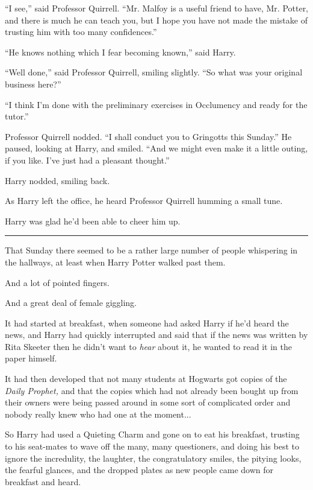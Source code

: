 ``I see,'' said Professor Quirrell. ``Mr. Malfoy is a useful friend to
have, Mr. Potter, and there is much he can teach you, but I hope you
have not made the mistake of trusting him with too many confidences.''

``He knows nothing which I fear becoming known,'' said Harry.

``Well done,'' said Professor Quirrell, smiling slightly. ``So what was
your original business here?''

``I think I'm done with the preliminary exercises in Occlumency and
ready for the tutor.''

Professor Quirrell nodded. ``I shall conduct you to Gringotts this
Sunday.'' He paused, looking at Harry, and smiled. ``And we might even
make it a little outing, if you like. I've just had a pleasant
thought.''

Harry nodded, smiling back.

As Harry left the office, he heard Professor Quirrell humming a small
tune.

Harry was glad he'd been able to cheer him up.

\begin{center}\rule{3in}{0.4pt}\end{center}

That Sunday there seemed to be a rather large number of people
whispering in the hallways, at least when Harry Potter walked past them.

And a lot of pointed fingers.

And a great deal of female giggling.

It had started at breakfast, when someone had asked Harry if he'd heard
the news, and Harry had quickly interrupted and said that if the news
was written by Rita Skeeter then he didn't want to \emph{hear} about it,
he wanted to read it in the paper himself.

It had then developed that not many students at Hogwarts got copies of
the \emph{Daily Prophet,} and that the copies which had not already been
bought up from their owners were being passed around in some sort of
complicated order and nobody really knew who had one at the
moment...

So Harry had used a Quieting Charm and gone on to eat his breakfast,
trusting to his seat-mates to wave off the many, many questioners, and
doing his best to ignore the incredulity, the laughter, the
congratulatory smiles, the pitying looks, the fearful glances, and the
dropped plates as new people came down for breakfast and heard.

